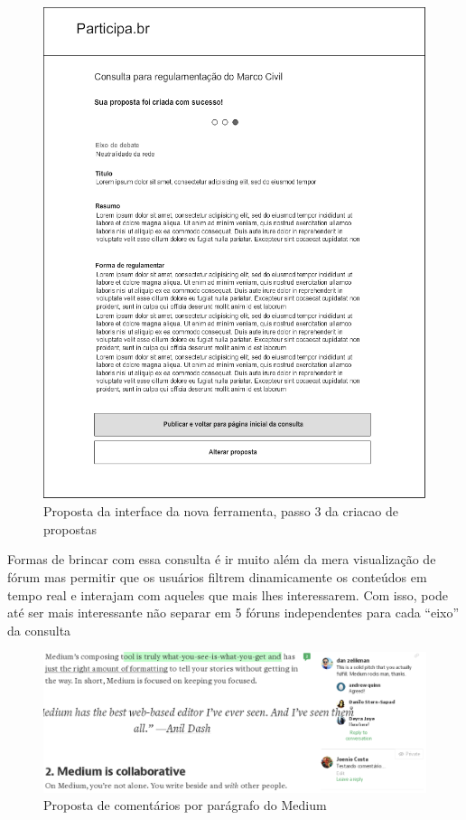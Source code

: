 \documentclass[12pt]{article}
\begin{document}
\begin{figure}[h]
\center
\includegraphics[scale=0.5]{05_-_proposta_passo_final.png}
\caption{Proposta da interface da nova ferramenta, passo 3 da criacao de
propostas}
\label{fig:proposta04}
\end{figure}

Formas de brincar com essa consulta é ir muito além da mera visualização de
fórum mas permitir que os usuários filtrem dinamicamente os conteúdos em tempo
real e interajam com aqueles que mais lhes interessarem. Com isso, pode até
ser mais interessante não separar em 5 fóruns independentes para cada “eixo”
da consulta

\begin{figure}[h]
\center
\includegraphics[scale=0.4]{medium.png}
\caption{Proposta de comentários por parágrafo do Medium}
\label{fig:medium}
\end{figure}
\end{document}
